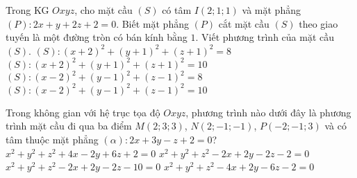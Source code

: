 \begin{ex}%
	Trong KG $Oxyz$, cho mặt cầu $\left( S \right)$ có tâm $I\left( 2;1;1 \right)$ và mặt phẳng $\left( P \right)\colon2x+y+2z+2=0$. Biết mặt phẳng $\left( P \right)$ cắt mặt cầu $\left( S \right)$ theo giao tuyến là một đường tròn có bán kính bằng $1$. Viết phương trình của mặt cầu $\left( S \right)$.
	\choice
	{$\left( S \right)\colon\left( x+2 \right)^2+\left( y+1 \right)^2+\left( z+1 \right)^2=8$}
	{$\left( S \right)\colon\left( x+2 \right)^2+\left( y+1 \right)^2+\left( z+1 \right)^2=10$}
	{$\left( S \right)\colon\left( x-2 \right)^2+\left( y-1 \right)^2+\left( z-1 \right)^2=8$}
	{\True $\left( S \right)\colon\left( x-2 \right)^2+\left( y-1 \right)^2+\left( z-1 \right)^2=10$}
\end{ex}

\begin{ex}%
	Trong không gian với hệ trục tọa độ $Oxyz$, phương trình nào dưới đây là phương trình mặt cầu đi qua ba điểm $M\left( 2;3;3 \right)$, $N\left( 2;-1;-1 \right)$, $P\left( -2;-1;3 \right)$ và có tâm thuộc mặt phẳng $\left( \alpha \right)\colon2x+3y-z+2=0$?
	\choice
	{$x^2+y^2+z^2+4x-2y+6z+2=0$}
	{$x^2+y^2+z^2-2x+2y-2z-2=0$}
	{$x^2+y^2+z^2-2x+2y-2z-10=0$}
	{\True $x^2+y^2+z^2-4x+2y-6z-2=0$}
\end{ex}

